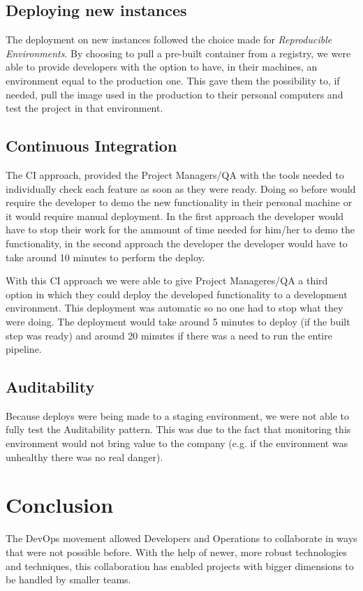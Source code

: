 \documentclass{llncs}
\begin{document}
  \subsection{Deploying new instances}
  The deployment on new instances followed the choice made for \textit{Reproducible Environments}. By choosing to pull a pre-built container from a registry, we were able to provide developers with the option to have, in their machines, an environment equal to the production one. This gave them the possibility to, if needed, pull the image used in the production to their personal computers and test the project in that environment.

  \subsection{Continuous Integration}

  The CI approach, provided the Project Managers/QA with the tools needed to individually check each feature as soon as they were ready. Doing so before would require the developer to demo the new functionality in their personal machine or it would require manual deployment. In the first approach the developer would have to stop their work for the ammount of time needed for him/her to demo the functionality, in the second approach the developer the developer would have to take around 10 minutes to perform the deploy.

   With this CI approach we were able to give Project Manageres/QA a third option in which they could deploy the developed functionality to a development environment. This deployment was automatic so no one had to stop what they were doing. The deployment would take around 5 minutes to deploy (if the built step was ready) and around 20 minutes if there was a need to run the entire pipeline.

  \subsection{Auditability}

  Because deploys were being made to a staging environment, we were not able to fully test the Auditability pattern. This was due to the fact that monitoring this environment would not bring value to the company (e.g. if the environment was unhealthy there was no real danger).

\section{Conclusion}
	The DevOps movement allowed Developers and Operations to collaborate in ways that were not possible before. With the help of newer, more robust technologies and techniques, this collaboration has enabled projects with bigger dimensions to be handled by smaller teams.
\end{document}
